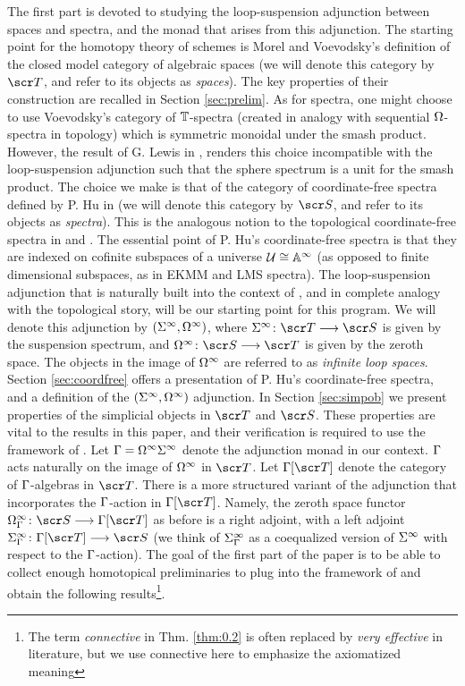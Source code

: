 \documentclass{amsart}
\theoremstyle{definition}
\begin{document}
The first part is devoted to studying the loop-suspension adjunction between spaces and spectra, and the monad that arises from this adjunction. The starting point for the homotopy theory of schemes is Morel and Voevodsky's definition of the closed model category of algebraic spaces (we will denote this category by $\sT$, and refer to its objects as \emph{spaces}). The key properties of their construction are recalled in Section \ref{sec:prelim}. As for spectra, one might choose to use Voevodsky's category of $\mathbb{T}$-spectra (created in analogy with sequential $\Omega$-spectra in topology) which is symmetric monoidal under the smash product. However, the result of G. Lewis in \cite{Lewis91}, renders this choice incompatible with the loop-suspension adjunction such that the sphere spectrum is a unit for the smash product. The choice we make is that of the category of coordinate-free spectra defined by P. Hu in \cite{Hu03} (we will denote this category by $\sS$, and refer to its objects as \emph{spectra}). This is the analogous notion to the topological coordinate-free spectra in \cite{EKMM97} and \cite{LMS86}. The essential point of P. Hu's coordinate-free spectra is that they are indexed on cofinite subspaces of a universe ${\mathcal{U}} \cong \mathbb{A}^{\infty}$ (as opposed to finite dimensional subspaces, as in EKMM and LMS spectra). The loop-suspension adjunction that is naturally built into the context of \cite{Hu03}, and in complete analogy with the topological story, will be our starting point for this program. We will denote this adjunction by $(\Sigma^{\infty},\Omega^{\infty})$, where $\SI^{\infty} \colon \sT \rtarr \sS$ is given by the suspension spectrum, and $\OM^{\infty} \colon \sS \rtarr \sT$ is given by the zeroth space. The objects in the image of $\Omega^{\infty}$ are referred to as \emph{infinite loop spaces}. Section \ref{sec:coordfree} offers a presentation of P. Hu's coordinate-free spectra, and a definition of the $(\Sigma^{\infty},\Omega^{\infty})$ adjunction. In Section \ref{sec:simpob} we present properties of the simplicial objects in $\sT$ and $\sS$. These properties are vital to the results in this paper, and their verification is required to use the framework of \cite{kong2024group}.
Let $\Gamma = \Omega^{\infty}\Sigma^{\infty}$ denote the adjunction monad in our context. $\Gamma$ acts naturally on the image of $\Omega^{\infty}$ in $\sT$. Let $\GA[\sT]$ denote the category of $\Gamma$-algebras in $\sT$. There is a more structured variant of the adjunction that incorporates the $\Gamma$-action in $\GA[\sT]$. Namely, the zeroth space functor $\OM^{\infty}_{\GA} \colon \sS \rtarr \GA[\sT]$ as before is a right adjoint, with a left adjoint $\SI^{\infty}_{\GA} \colon \GA[\sT] \rtarr \sS$ (we think of $\Sigma^{\infty}_{\Gamma}$ as a coequalized version of $\Sigma^{\infty}$ with respect to the $\Gamma$-action).  The goal of the first part of the paper is to be able to collect enough homotopical preliminaries to plug into the framework of \cite{kong2024group} and obtain the following results\footnote{The term \emph{connective} in Thm. \ref{thm:0.2} is often replaced by \emph{very effective} in literature, but we use connective here to emphasize the axiomatized meaning}.
\end{document}

